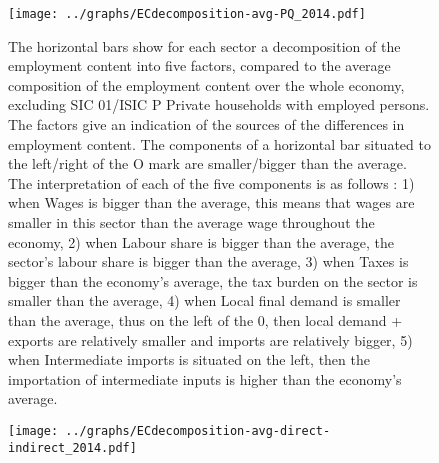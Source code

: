 \documentclass[12pt,english]{article}
\begin{document}


\begin{figure}[!ht]
	\centering
	\texttt{[image: ../graphs/ECdecomposition-avg-PQ\_2014.pdf]}
	\caption{\footnotesize \label{Decomposition_PQ}The horizontal bars show for each sector a decomposition of the employment content into five factors, compared to the average composition of the employment content over the whole economy, excluding SIC 01/ISIC P Private households with employed persons. The factors give an indication of the sources of the differences in employment content. The components of a horizontal bar situated to the left/right of the O mark are smaller/bigger than the average. The interpretation of each of the five components is as follows : 1) when Wages is bigger than the average, this means that wages are smaller in this sector than the average wage throughout the economy, 2) when Labour share is bigger than the average, the sector's labour share is bigger than the average, 3) when Taxes is bigger than the economy's average, the tax burden on the sector is smaller than the average, 4) when Local final demand is smaller than the average, thus on the left of the 0, then local demand + exports are relatively smaller and imports are relatively bigger, 5) when Intermediate imports is situated on the left, then the importation of intermediate inputs is higher than the economy's average.}
\end{figure}	

\begin{figure}[!ht]
	\centering
	\thispagestyle{empty}
		\texttt{[image: ../graphs/ECdecomposition-avg-direct-indirect\_2014.pdf]}
	\caption{\label{Decomposition_direct_indirect_avg}}
\end{figure}	
\end{document}
